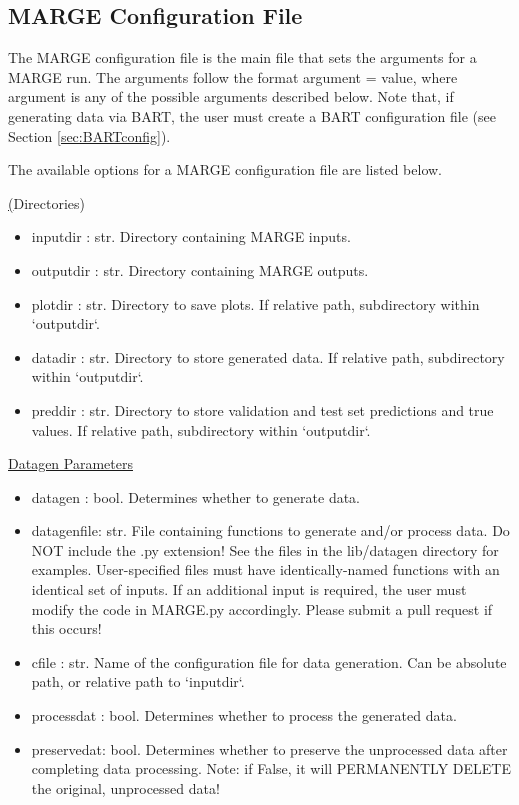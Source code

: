 \documentclass[letterpaper, 12pt]{article}
\begin{document}
\subsection{MARGE Configuration File}
\label{sec:config}
The MARGE configuration file is the main file that sets the arguments for a 
MARGE run. The arguments follow the format {\ttb argument = value}, where 
{\ttb argument} is any of the possible arguments described below. Note that, 
if generating data via BART, the user must create a BART configuration file 
(see Section \ref{sec:BARTconfig}).

\noindent The available options for a MARGE configuration file are listed below.

\noindent \underline(Directories)
\begin{itemize}
\item inputdir   : str.  Directory containing MARGE inputs.
\item outputdir  : str.  Directory containing MARGE outputs.
\item plotdir    : str.  Directory to save plots. 
                         If relative path, subdirectory within `outputdir`.
\item datadir    : str.  Directory to store generated data. 
                         If relative path, subdirectory within `outputdir`.
\item preddir    : str.  Directory to store validation and test set predictions and true values. 
                         If relative path, subdirectory within `outputdir`.
\end{itemize}

\noindent \underline{Datagen Parameters}
\begin{itemize}
\item datagen    : bool. Determines whether to generate data.
\item datagenfile: str.  File containing functions to generate and/or process 
                         data.  Do NOT include the .py extension!
                         See the files in the lib/datagen directory for examples.
                         User-specified files must have identically-named 
                         functions with an identical set of inputs.  If an 
                         additional input is required, the user must modify the 
                         code in MARGE.py accordingly.  
                         Please submit a pull request if this occurs!
\item cfile      : str.  Name of the configuration file for data generation.
                         Can be absolute path, or relative path to `inputdir`.
\item processdat : bool. Determines whether to process the generated data.
\item preservedat: bool. Determines whether to preserve the unprocessed data after 
                   completing data processing.
                   Note: if False, it will PERMANENTLY DELETE the original, 
                         unprocessed data!
\end{itemize}
\end{document}
